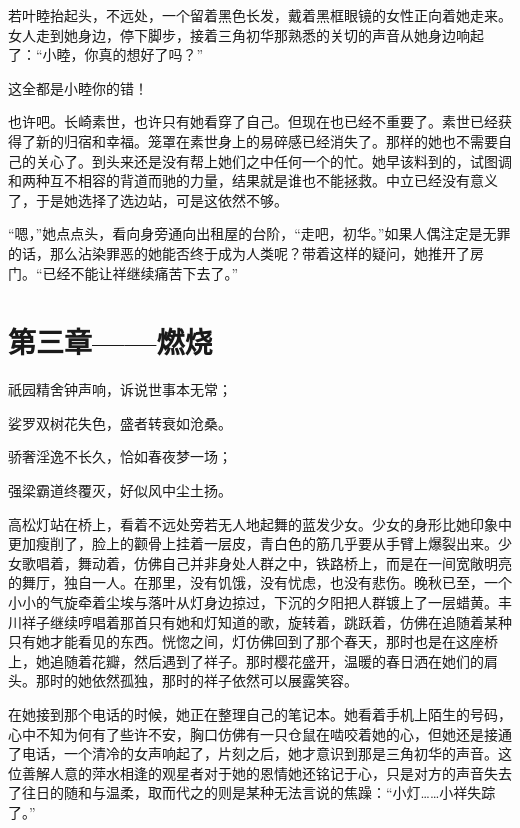 \documentclass{article}
\begin{document}
若叶睦抬起头，不远处，一个留着黑色长发，戴着黑框眼镜的女性正向着她走来。女人走到她身边，停下脚步，接着三角初华那熟悉的关切的声音从她身边响起了：“小睦，你真的想好了吗？”



这全都是小睦你的错！



也许吧。长崎素世，也许只有她看穿了自己。但现在也已经不重要了。素世已经获得了新的归宿和幸福。笼罩在素世身上的易碎感已经消失了。那样的她也不需要自己的关心了。到头来还是没有帮上她们之中任何一个的忙。她早该料到的，试图调和两种互不相容的背道而驰的力量，结果就是谁也不能拯救。中立已经没有意义了，于是她选择了选边站，可是这依然不够。



“嗯，”她点点头，看向身旁通向出租屋的台阶，“走吧，初华。”如果人偶注定是无罪的话，那么沾染罪恶的她能否终于成为人类呢？带着这样的疑问，她推开了房门。“已经不能让祥继续痛苦下去了。”



\newpage





{\centering\section*{第三章——燃烧}}





祇园精舍钟声响，诉说世事本无常；

娑罗双树花失色，盛者转衰如沧桑。

骄奢淫逸不长久，恰如春夜梦一场；

强梁霸道终覆灭，好似风中尘土扬。



高松灯站在桥上，看着不远处旁若无人地起舞的蓝发少女。少女的身形比她印象中更加瘦削了，脸上的颧骨上挂着一层皮，青白色的筋几乎要从手臂上爆裂出来。少女歌唱着，舞动着，仿佛自己并非身处人群之中，铁路桥上，而是在一间宽敞明亮的舞厅，独自一人。在那里，没有饥饿，没有忧虑，也没有悲伤。晚秋已至，一个小小的气旋牵着尘埃与落叶从灯身边掠过，下沉的夕阳把人群镀上了一层蜡黄。丰川祥子继续哼唱着那首只有她和灯知道的歌，旋转着，跳跃着，仿佛在追随着某种只有她才能看见的东西。恍惚之间，灯仿佛回到了那个春天，那时也是在这座桥上，她追随着花瓣，然后遇到了祥子。那时樱花盛开，温暖的春日洒在她们的肩头。那时的她依然孤独，那时的祥子依然可以展露笑容。



在她接到那个电话的时候，她正在整理自己的笔记本。她看着手机上陌生的号码，心中不知为何有了些许不安，胸口仿佛有一只仓鼠在啮咬着她的心，但她还是接通了电话，一个清冷的女声响起了，片刻之后，她才意识到那是三角初华的声音。这位善解人意的萍水相逢的观星者对于她的恩情她还铭记于心，只是对方的声音失去了往日的随和与温柔，取而代之的则是某种无法言说的焦躁：“小灯……小祥失踪了。”
\end{document}
